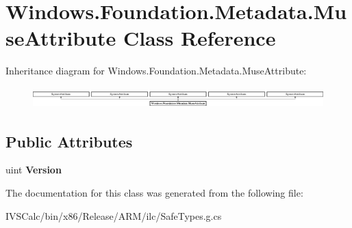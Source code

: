 \hypertarget{class_windows_1_1_foundation_1_1_metadata_1_1_muse_attribute}{}\section{Windows.\+Foundation.\+Metadata.\+Muse\+Attribute Class Reference}
\label{class_windows_1_1_foundation_1_1_metadata_1_1_muse_attribute}
Inheritance diagram for Windows.\+Foundation.\+Metadata.\+Muse\+Attribute\+:\begin{figure}[H]
\begin{center}
\leavevmode
\includegraphics[height=0.814545cm]{class_windows_1_1_foundation_1_1_metadata_1_1_muse_attribute}
\end{center}
\end{figure}
\subsection*{Public Attributes}
\begin{DoxyCompactItemize}
\item 
\mbox{\label{class_windows_1_1_foundation_1_1_metadata_1_1_muse_attribute_a2b64eb88088d36da9a9e2ede97ee2149}} 
uint {\bfseries Version}
\end{DoxyCompactItemize}


The documentation for this class was generated from the following file\+:\begin{DoxyCompactItemize}
\item 
I\+V\+S\+Calc/bin/x86/\+Release/\+A\+R\+M/ilc/Safe\+Types.\+g.\+cs\end{DoxyCompactItemize}
